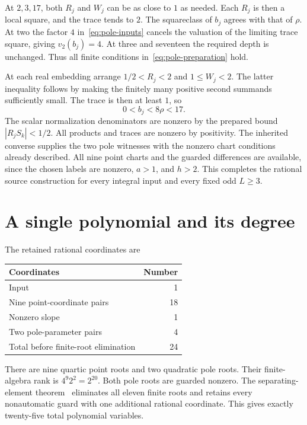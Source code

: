 \documentclass[11pt,a4paper]{article}
\begin{document}
At $2,3,17$, both $R_j$ and $W_j$ can be as close to $1$ as
needed. Each $R_j$ is then a local square, and the trace tends
to $2$. The squareclass of $b_j$ agrees with that of $\rho$.
At two the factor $4$ in~\eqref{eq:pole-inputs} cancels the
valuation of the limiting trace square, giving $v_2(b_j)=4$.
At three and seventeen the required depth is unchanged. Thus
all finite conditions in~\eqref{eq:pole-preparation} hold.

At each real embedding arrange $1/2<R_j<2$ and $1\le W_j<2$.
The latter inequality follows by making the finitely many positive
second summands sufficiently small. The trace is then at least
$1$, so
\[
                         0<b_j<8\rho<17.
\]
The scalar normalization denominators are nonzero by the prepared
bound $|R_jS_k|<1/2$. All products and traces are nonzero by
positivity. The inherited converse supplies the two pole witnesses
with the nonzero chart conditions already described. All nine point
charts and the guarded differences are available, since the chosen
labels are nonzero, $a>1$, and $h>2$. This completes the rational
source construction for every integral input and every fixed odd
$L\ge3$.

\section{A single polynomial and its degree}

The retained rational coordinates are
\begin{center}
\begin{tabular}{lr}
\toprule
Coordinates & Number\\
\midrule
Input & 1\\
Nine point-coordinate pairs & 18\\
Nonzero slope & 1\\
Two pole-parameter pairs & 4\\
\midrule
Total before finite-root elimination & 24\\
\bottomrule
\end{tabular}
\end{center}
There are nine quartic point roots and two quadratic pole roots.
Their finite-algebra rank is $4^9 2^2=2^{20}$. Both pole roots
are guarded nonzero. The separating-element theorem~\cite{Active}
eliminates all eleven finite roots and retains every nonautomatic
guard with one additional rational coordinate. This gives exactly
twenty-five total polynomial variables.
\end{document}
